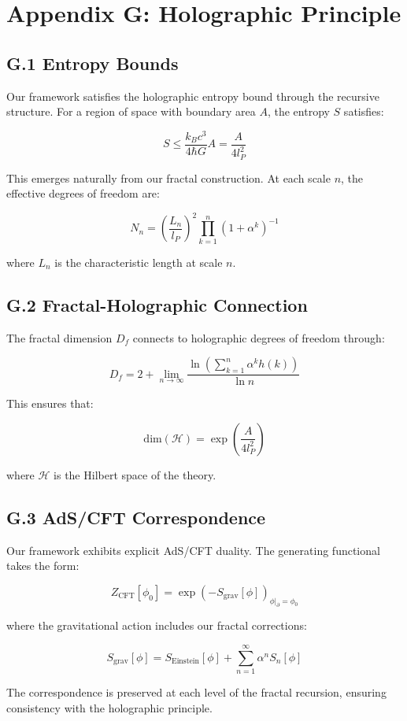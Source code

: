 \section*{Appendix G: Holographic Principle}
\label{app:holographic}

\subsection*{G.1 Entropy Bounds}
\label{subsec:entropy_bounds}

Our framework satisfies the holographic entropy bound through the recursive structure. For a region of space with boundary area $A$, the entropy $S$ satisfies:

\[
S \leq \frac{k_B c^3}{4\hbar G} A = \frac{A}{4l_P^2}
\]

This emerges naturally from our fractal construction. At each scale $n$, the effective degrees of freedom are:

\[
N_n = \left(\frac{L_n}{l_P}\right)^2 \prod_{k=1}^n (1 + \alpha^k)^{-1}
\]

where $L_n$ is the characteristic length at scale $n$.

\subsection*{G.2 Fractal-Holographic Connection}
\label{subsec:fractal_holographic}

The fractal dimension $D_f$ connects to holographic degrees of freedom through:

\[
D_f = 2 + \lim_{n \to \infty} \frac{\ln\left(\sum_{k=1}^n \alpha^k h(k)\right)}{\ln n}
\]

This ensures that:

\[
\text{dim}(\mathcal{H}) = \exp\left(\frac{A}{4l_P^2}\right)
\]

where $\mathcal{H}$ is the Hilbert space of the theory.

\subsection*{G.3 AdS/CFT Correspondence}
\label{subsec:ads_cft}

Our framework exhibits explicit AdS/CFT duality. The generating functional takes the form:

\[
Z_{\text{CFT}}[\phi_0] = \exp\left(-S_{\text{grav}}[\phi]\right)_{\phi|_{\partial} = \phi_0}
\]

where the gravitational action includes our fractal corrections:

\[
S_{\text{grav}}[\phi] = S_{\text{Einstein}}[\phi] + \sum_{n=1}^{\infty} \alpha^n S_n[\phi]
\]

The correspondence is preserved at each level of the fractal recursion, ensuring consistency with the holographic principle. 